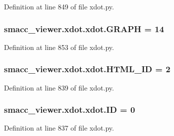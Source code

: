Definition at line 849 of file xdot.\+py.

\subsubsection[{\texorpdfstring{G\+R\+A\+PH}{GRAPH}}]{ smacc\+\_\+viewer.\+xdot.\+xdot.\+G\+R\+A\+PH = 14}\hypertarget{namespacesmacc__viewer_1_1xdot_1_1xdot_a17ce1b4c8cbf1b0c0dcd6f5c43d87607}{}\label{namespacesmacc__viewer_1_1xdot_1_1xdot_a17ce1b4c8cbf1b0c0dcd6f5c43d87607}


Definition at line 853 of file xdot.\+py.

\subsubsection[{\texorpdfstring{H\+T\+M\+L\+\_\+\+ID}{HTML_ID}}]{ smacc\+\_\+viewer.\+xdot.\+xdot.\+H\+T\+M\+L\+\_\+\+ID = 2}\hypertarget{namespacesmacc__viewer_1_1xdot_1_1xdot_a7ac35a573db8d74083f773b90bba5a52}{}\label{namespacesmacc__viewer_1_1xdot_1_1xdot_a7ac35a573db8d74083f773b90bba5a52}


Definition at line 839 of file xdot.\+py.

\subsubsection[{\texorpdfstring{ID}{ID}}]{ smacc\+\_\+viewer.\+xdot.\+xdot.\+ID = 0}\hypertarget{namespacesmacc__viewer_1_1xdot_1_1xdot_a3df7022e8a60919d6739a3759ac1db56}{}\label{namespacesmacc__viewer_1_1xdot_1_1xdot_a3df7022e8a60919d6739a3759ac1db56}


Definition at line 837 of file xdot.\+py.

